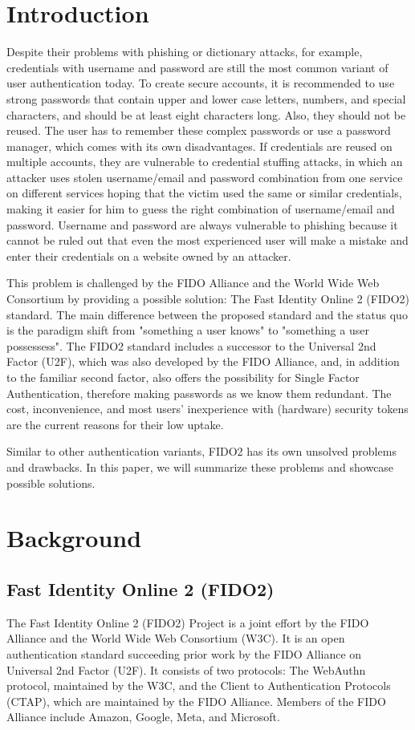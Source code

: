\documentclass[runningheads]{llncs}
\begin{document}
\section{Introduction}
Despite their problems with phishing or dictionary attacks, for example, credentials with username and password are still the most common variant of user authentication today. To create secure accounts, it is recommended to use strong passwords that contain upper and lower case letters, numbers, and special characters, and should be at least eight characters long. Also, they should not be reused. The user has to remember these complex passwords or use a password manager, which comes with its own disadvantages. If credentials are reused on multiple accounts, they are vulnerable to credential stuffing attacks, in which an attacker uses stolen username/email and password combination from one service on different services hoping that the victim used the same or similar credentials, making it easier for him to guess the right combination of username/email and password. Username and password are always vulnerable to phishing because it cannot be ruled out that even the most experienced user will make a mistake and enter their credentials on a website owned by an attacker.

This problem is challenged by the FIDO Alliance and the World Wide Web Consortium by providing a possible solution: The Fast Identity Online 2 (FIDO2) standard. The main difference between the proposed standard and the status quo is the paradigm shift from "something a user knows" to "something a user possessess". The FIDO2 standard includes a successor to the Universal 2nd Factor (U2F), which was also developed by the FIDO Alliance, and, in addition to the familiar second factor, also offers the possibility for Single Factor Authentication, therefore making passwords as we know them redundant. The cost, inconvenience, and most users' inexperience with (hardware) security tokens are the current reasons for their low uptake.\cite{274547}\cite{9152694}

Similar to other authentication variants, FIDO2 has its own unsolved problems and drawbacks. In this paper, we will summarize these problems and showcase possible solutions. 

\section{Background}
\subsection{Fast Identity Online 2 (FIDO2)}
The Fast Identity Online 2 (FIDO2) Project is a joint effort by the FIDO Alliance and the World Wide Web Consortium (W3C). It is an open authentication standard succeeding prior work by the FIDO Alliance on Universal 2nd Factor (U2F). \cite{9152694}  It consists of two protocols: The WebAuthn protocol, maintained by the W3C, and the Client to Authentication Protocols (CTAP), which are maintained by the FIDO Alliance. Members of the FIDO Alliance include Amazon, Google, Meta, and Microsoft.
\end{document}
